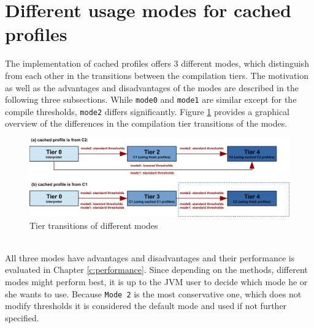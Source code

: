 \section{Different usage modes for cached profiles}
\label{s:cacheprofilesmode}
The implementation of cached profiles offers 3 different modes, which distinguish from each other in the transitions between the compilation tiers.
The motivation as well as the advantages and disadvantages of the modes are described in the following three subsections.
While \texttt{mode0} and \texttt{mode1} are similar except for the compile thresholds, \texttt{mode2} differs significantly.
Figure \ref{f:hs_tiers_thresholds} provides a graphical overview of the differences in the compilation tier transitions of the modes.
\begin{figure}[h]
  \begin{center}
    \centering
    \includegraphics{figures/hs_tiers_threshold.png}
    \caption{Tier transitions of different modes}
    \label{f:hs_tiers_thresholds}
  \end{center}
\end{figure}\\
All three modes have advantages and disadvantages and their performance is evaluated in Chapter \ref{c:performance}. Since depending on the methods, different modes might perform best, it is up to the JVM user to decide which mode he or she wants to use. Because \texttt{Mode 2} is the most conservative one, which does not modify thresholds it is considered the default mode and used if not further specified.

